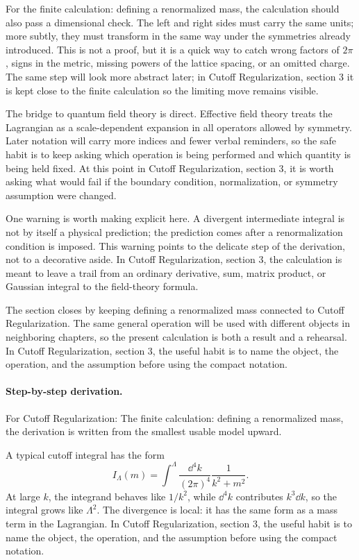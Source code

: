 For the finite calculation: defining a renormalized mass, the calculation should also pass a dimensional check.  The left and right sides must carry the same units; more subtly, they must transform in the same way under the symmetries already introduced.  This is not a proof, but it is a quick way to catch wrong factors of \(2\pi\), signs in the metric, missing powers of the lattice spacing, or an omitted charge.  The same step will look more abstract later; in Cutoff Regularization, section 3 it is kept close to the finite calculation so the limiting move remains visible.

The bridge to quantum field theory is direct.  Effective field theory treats the Lagrangian as a scale-dependent expansion in all operators allowed by symmetry.  Later notation will carry more indices and fewer verbal reminders, so the safe habit is to keep asking which operation is being performed and which quantity is being held fixed.  At this point in Cutoff Regularization, section 3, it is worth asking what would fail if the boundary condition, normalization, or symmetry assumption were changed.

One warning is worth making explicit here.  A divergent intermediate integral is not by itself a physical prediction; the prediction comes after a renormalization condition is imposed.  This warning points to the delicate step of the derivation, not to a decorative aside.  In Cutoff Regularization, section 3, the calculation is meant to leave a trail from an ordinary derivative, sum, matrix product, or Gaussian integral to the field-theory formula.

The section closes by keeping defining a renormalized mass connected to Cutoff Regularization.  The same general operation will be used with different objects in neighboring chapters, so the present calculation is both a result and a rehearsal.  In Cutoff Regularization, section 3, the useful habit is to name the object, the operation, and the assumption before using the compact notation.



\paragraph{Step-by-step derivation.}

For Cutoff Regularization: The finite calculation: defining a renormalized mass, the derivation is written from the smallest usable model upward.

A typical cutoff integral has the form
\[
  I_\Lambda(m)=\int^{\Lambda}\frac{\dd^4k}{(2\pi)^4}\frac{1}{k^2+m^2}.
\]
At large \(k\), the integrand behaves like \(1/k^2\), while \(\dd^4k\) contributes \(k^3\dd k\), so the integral grows like \(\Lambda^2\).  The divergence is local: it has the same form as a mass term in the Lagrangian.  In Cutoff Regularization, section 3, the useful habit is to name the object, the operation, and the assumption before using the compact notation.

